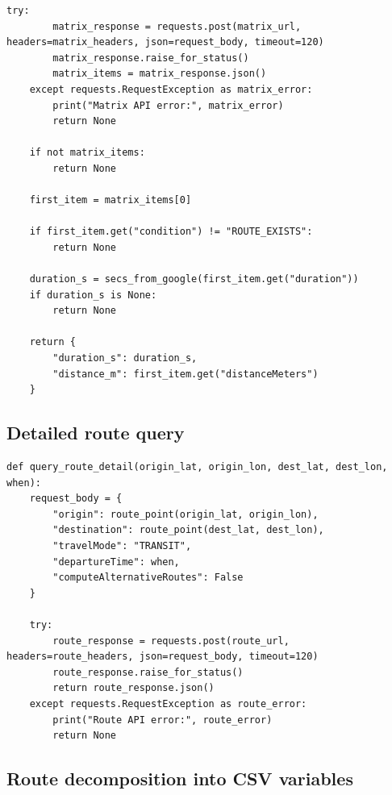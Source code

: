 \documentclass[11pt,a4paper]{article}
\begin{document}
\begin{appendices}
\begin{lstlisting}[style=pythonappendix, caption={Matrix API query for route availability and total journey time}, label={lst:matrix_query}]
    try:
        matrix_response = requests.post(matrix_url, headers=matrix_headers, json=request_body, timeout=120)
        matrix_response.raise_for_status()
        matrix_items = matrix_response.json()
    except requests.RequestException as matrix_error:
        print("Matrix API error:", matrix_error)
        return None

    if not matrix_items:
        return None

    first_item = matrix_items[0]

    if first_item.get("condition") != "ROUTE_EXISTS":
        return None

    duration_s = secs_from_google(first_item.get("duration"))
    if duration_s is None:
        return None

    return {
        "duration_s": duration_s,
        "distance_m": first_item.get("distanceMeters")
    }
\end{lstlisting}

\subsection*{Detailed route query}

\begin{lstlisting}[style=pythonappendix, caption={Detailed route query for step-level journey information}, label={lst:route_detail_query}]
def query_route_detail(origin_lat, origin_lon, dest_lat, dest_lon, when):
    request_body = {
        "origin": route_point(origin_lat, origin_lon),
        "destination": route_point(dest_lat, dest_lon),
        "travelMode": "TRANSIT",
        "departureTime": when,
        "computeAlternativeRoutes": False
    }

    try:
        route_response = requests.post(route_url, headers=route_headers, json=request_body, timeout=120)
        route_response.raise_for_status()
        return route_response.json()
    except requests.RequestException as route_error:
        print("Route API error:", route_error)
        return None
\end{lstlisting}

\subsection*{Route decomposition into CSV variables}


\end{appendices}
\end{document}
